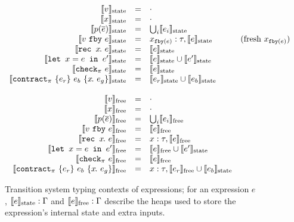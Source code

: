 \documentclass[a4paper,UKenglish,cleveref, autoref, thm-restate,anonymous]{lipics-v2021}
\begin{document}
\newcommand{\sysinit}[1]{\systrans{#1}_{\text{init}}}
\newcommand{\sysvalue}[1]{\systrans{#1}_{\text{value}}}
\newcommand{\sysupdate}[1]{\systrans{#1}_{\text{update}}}
\newcommand{\sysrely}[1]{\systrans{#1}_{\text{rely}}}
\newcommand{\sysguar}[1]{\systrans{#1}_{\text{guar}}}
\newcommand{\xctr}{\xcontractP{\PStatus}{e_r}{e_b}{\rawbind{x}{e_g}}}

\newcommand{\sysstate}[1]{\systrans{#1}_{\text{state}}}
\newcommand{\sysoracle}[1]{\systrans{#1}_{\text{free}}}

\begin{figure}
  \small
  \[
  \begin{array}{rrlr}
    \sysstate{v} & = & \cdot \\
    \sysstate{x} & = & \cdot \\
    \sysstate{p(\ov{e})} & = & \bigcup_i \sysstate{e_i} \\
    \sysstate{\xfby{v}{e}} & = & x_{\tt{fby}(e)}: \tau, \sysstate{e} & \text{(fresh $x_{\tt{fby}(e)}$)} \\
    \sysstate{\xrec{x}{e}} & = & \sysstate{e} \\
    \sysstate{\xlet{x}{e}{e'}} & = & \sysstate{e} \cup \sysstate{e'} \\
    \sysstate{\xcheckP{\PStatus}{e}} & = & \sysstate{e} \\
    \sysstate{\xctr} & = & \sysstate{e_r} \cup \sysstate{e_b} \\
    \\
    \sysoracle{v} & = & \cdot \\
    \sysoracle{x} & = & \cdot \\
    \sysoracle{p(\ov{e})} & = & \bigcup_i \sysoracle{e_i} \\
    \sysoracle{\xfby{v}{e}} & = & \sysoracle{e} \\
    \sysoracle{\xrec{x}{e}} & = & x: \tau, \sysoracle{e} \\
    \sysoracle{\xlet{x}{e}{e'}} & = & \sysoracle{e} \cup \sysstate{e'} \\
    \sysoracle{\xcheckP{\PStatus}{e}} & = & \sysoracle{e} \\
    \sysoracle{\xctr} & = & x: \tau, \sysoracle{e_r} \cup \sysstate{e_b} \\
  \end{array}
\]
\caption{Transition system typing contexts of expressions; for an expression $e$, $\sysstate{e} : \Gamma$ and $\sysoracle{e} : \Gamma$ describe the heaps used to store the expression's internal state and extra inputs.}
\label{f:system-translation-contexts}
\end{figure}
\end{document}
